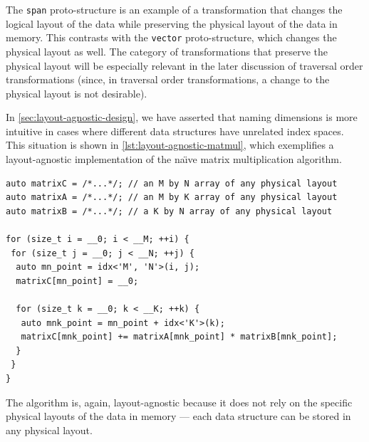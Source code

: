 The \lstinline{span} proto-structure is an example of a transformation that changes the logical layout of the data while preserving the physical layout of the data in memory. This contrasts with the \lstinline{vector} proto-structure, which changes the physical layout as well. The category of transformations that preserve the physical layout will be especially relevant in the later discussion of traversal order transformations (since, in traversal order transformations, a change to the physical layout is not desirable).


In \cref{sec:layout-agnostic-design}, we have asserted that naming dimensions is more intuitive in cases where different data structures have unrelated index spaces. This situation is shown in \cref{lst:layout-agnostic-matmul}, which exemplifies a layout-agnostic implementation of the na\"{\i}ve matrix multiplication algorithm.


\begin{lstlisting}[style=C++, caption={A layout-agnostic matrix multiplication algorithm using Noarr structures.}, label={lst:layout-agnostic-matmul}]
auto matrixC = /*...*/; // an M by N array of any physical layout
auto matrixA = /*...*/; // an M by K array of any physical layout
auto matrixB = /*...*/; // a K by N array of any physical layout

for (size_t i = __0; i < __M; ++i) {
 for (size_t j = __0; j < __N; ++j) {
  auto mn_point = idx<'M', 'N'>(i, j);
  matrixC[mn_point] = __0;

  for (size_t k = __0; k < __K; ++k) {
   auto mnk_point = mn_point + idx<'K'>(k);
   matrixC[mnk_point] += matrixA[mnk_point] * matrixB[mnk_point];
  }
 }
}
\end{lstlisting}

The algorithm is, again, layout-agnostic because it does not rely on the specific physical layouts of the data in memory --- each data structure can be stored in any physical layout.

